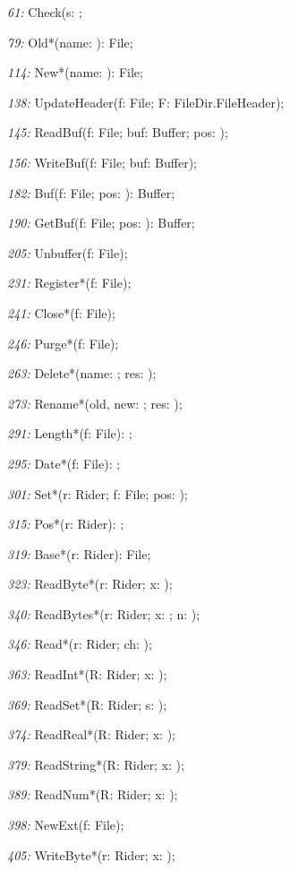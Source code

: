\item{\it 61:} Check(s: \ARRAYOF\CHAR;
\item{\it 79:} Old*(name: \ARRAYOF\CHAR): File;
\item{\it 114:} New*(name: \ARRAYOF\CHAR): File;
\item{\it 138:} UpdateHeader(f: File; \VAR F: FileDir.FileHeader);
\item{\it 145:} ReadBuf(f: File; buf: Buffer; pos: \INTEGER);
\item{\it 156:} WriteBuf(f: File; buf: Buffer);
\item{\it 182:} Buf(f: File; pos: \INTEGER): Buffer;
\item{\it 190:} GetBuf(f: File; pos: \INTEGER): Buffer;
\item{\it 205:} Unbuffer(f: File);
\item{\it 231:} Register*(f: File);
\item{\it 241:} Close*(f: File);
\item{\it 246:} Purge*(f: File);
\item{\it 263:} Delete*(name: \ARRAYOF\CHAR; \VAR res: \INTEGER);
\item{\it 273:} Rename*(old, new: \ARRAYOF\CHAR; \VAR res: \INTEGER);
\item{\it 291:} Length*(f: File): \INTEGER;
\item{\it 295:} Date*(f: File): \INTEGER;
\item{\it 301:} Set*(\VAR r: Rider; f: File; pos: \INTEGER);
\item{\it 315:} Pos*(\VAR r: Rider): \INTEGER;
\item{\it 319:} Base*(\VAR r: Rider): File;
\item{\it 323:} ReadByte*(\VAR r: Rider; \VAR x: \BYTE);
\item{\it 340:} ReadBytes*(\VAR r: Rider; \VAR x: \ARRAYOF \BYTE; n: \INTEGER);
\item{\it 346:} Read*(\VAR r: Rider; \VAR ch: \CHAR);
\item{\it 363:} ReadInt*(\VAR R: Rider; \VAR x: \INTEGER);
\item{\it 369:} ReadSet*(\VAR R: Rider; \VAR s: \SET);
\item{\it 374:} ReadReal*(\VAR R: Rider; \VAR x: \REAL);
\item{\it 379:} ReadString*(\VAR R: Rider; \VAR x: \ARRAYOF\CHAR);
\item{\it 389:} ReadNum*(\VAR R: Rider; \VAR x: \INTEGER);
\item{\it 398:} NewExt(f: File);
\item{\it 405:} WriteByte*(\VAR r: Rider; x: \BYTE);
